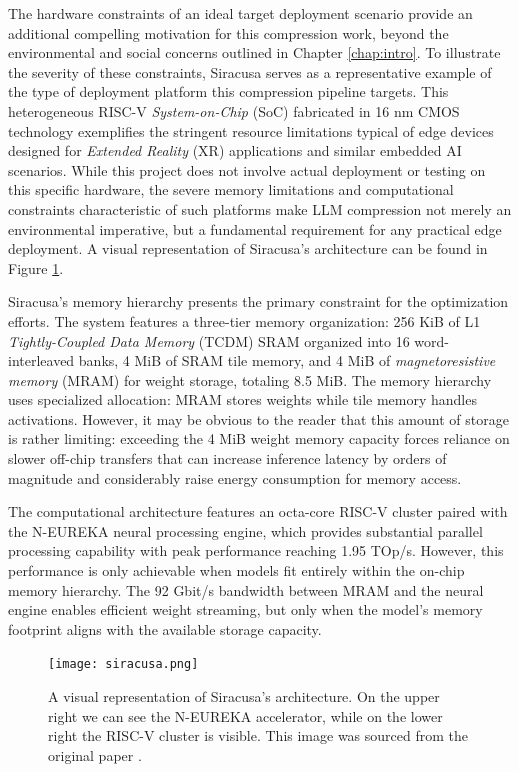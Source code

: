 The hardware constraints of an ideal target deployment scenario provide an additional compelling motivation for this compression work, beyond the environmental and social concerns outlined in Chapter \ref{chap:intro}. To illustrate the severity of these constraints, Siracusa \cite{target_hardware} serves as a representative example of the type of deployment platform this compression pipeline targets. This heterogeneous RISC-V \textit{System-on-Chip} (SoC) fabricated in 16 nm CMOS technology exemplifies the stringent resource limitations typical of edge devices designed for \textit{Extended Reality} (XR) applications and similar embedded AI scenarios. While this project does not involve actual deployment or testing on this specific hardware, the severe memory limitations and computational constraints characteristic of such platforms make LLM compression not merely an environmental imperative, but a fundamental requirement for any practical edge deployment. A visual representation of Siracusa's architecture can be found in Figure \ref{fig:siracusa}.

Siracusa's memory hierarchy presents the primary constraint for the optimization efforts. The system features a three-tier memory organization: 256 KiB of L1 \textit{Tightly-Coupled Data Memory} (TCDM) SRAM organized into 16 word-interleaved banks, 4 MiB of SRAM tile memory, and 4 MiB of \textit{magnetoresistive memory} (MRAM) for weight storage, totaling 8.5 MiB. The memory hierarchy uses specialized allocation: MRAM stores weights while tile memory handles activations. However, it may be obvious to the reader that this amount of storage is rather limiting: exceeding the 4 MiB weight memory capacity forces reliance on slower off-chip transfers that can increase inference latency by orders of magnitude and considerably raise energy consumption for memory access.

The computational architecture features an octa-core RISC-V cluster paired with the N-EUREKA neural processing engine, which provides substantial parallel processing capability with peak performance reaching 1.95 TOp/s. However, this performance is only achievable when models fit entirely within the on-chip memory hierarchy. The 92 Gbit/s bandwidth between MRAM and the neural engine enables efficient weight streaming, but only when the model's memory footprint aligns with the available storage capacity.

\begin{figure}[htbp]
    \centering
    \texttt{[image: siracusa.png]}
    \caption[The Architecture of Siracusa]{A visual representation of Siracusa's architecture. On the upper right we can see the N-EUREKA accelerator, while on the lower right the RISC-V cluster is visible. This image was sourced from the original paper \cite{target_hardware}.}
    \label{fig:siracusa}
\end{figure}

